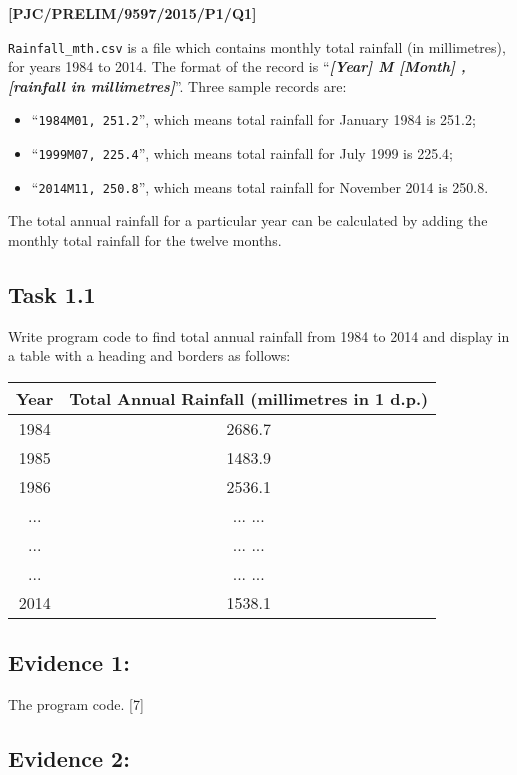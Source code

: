 \item \textbf{{[}PJC/PRELIM/9597/2015/P1/Q1{]} }

\texttt{Rainfall\_mth.csv} is a file which contains monthly total
rainfall (in millimetres), for years 1984 to 2014. The format of the
record is \textquotedblleft \textbf{\emph{{[}Year{]} M {[}Month{]}
, {[}rainfall in millimetres{]}}}\textquotedblright . Three sample
records are: 
\begin{itemize}
\item \textquotedblleft \texttt{1984M01, 251.2}\textquotedblright , which
means total rainfall for January 1984 is 251.2; 
\item \textquotedblleft \texttt{1999M07, 225.4}\textquotedblright , which
means total rainfall for July 1999 is 225.4; 
\item \textquotedblleft \texttt{2014M11, 250.8}\textquotedblright , which
means total rainfall for November 2014 is 250.8.
\end{itemize}
The total annual rainfall for a particular year can be calculated
by adding the monthly total rainfall for the twelve months. 

\subsection*{Task 1.1 }

Write program code to find total annual rainfall from 1984 to 2014
and display in a table with a heading and borders as follows: 
\noindent \begin{center}
\begin{tabular}{|c|c|}
\hline 
Year & Total Annual Rainfall (millimetres in 1 d.p.)\tabularnewline
\hline 
1984 & 2686.7\tabularnewline
\hline 
1985 & 1483.9\tabularnewline
\hline 
1986 & 2536.1\tabularnewline
\hline 
... & ... ...\tabularnewline
\hline 
... & ... ...\tabularnewline
\hline 
... & ... ...\tabularnewline
\hline 
2014 & 1538.1\tabularnewline
\hline 
\end{tabular}
\par\end{center}

\subsection*{Evidence 1: }

The program code. \hfill{}{[}7{]}

\subsection*{Evidence 2:}


